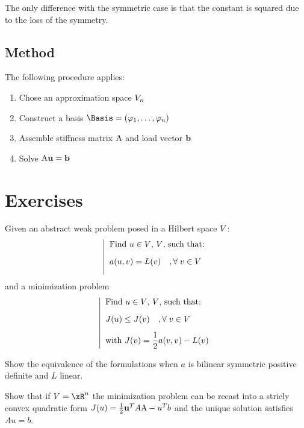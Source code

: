 The only difference with the symmetric case is that the constant is squared due to the loss of the symmetry.

\subsection{Method}

\begin{lgrthm}\label{alg:galerkin} The following procedure applies:
\begin{enumerate}
\item Chose an approximation space ${V}_n$
\item Construct a basis $\Basis= (\varphi_1,\dots,\varphi_n)$
\item Assemble stiffness matrix ${\mathrm A}$ and load vector $\mathbf b$
\item Solve ${\mathrm A} \mathbf u = \mathbf b$
\end{enumerate}
\end{lgrthm}



\newpage

\section{Exercises}

\begin{xrcs}
Given an abstract weak problem posed in a Hilbert space ${V}$:
\begin{equation*}
\left\lvert
\begin{array}{ll}
\mbox{Find $u \in {V}$, ${V}$, such that:}\\[2ex]
a( u, v ) = L(v)\quad,{\forall\;}  v \in {V}\\[2ex]
\end{array}
\right .
\end{equation*}
and a minimization problem
\begin{equation*}
\left\lvert
\begin{array}{ll}
\mbox{Find $u \in {V}$, ${V}$, such that:}\\[2ex]
J(u) \leq J(v)\quad,{\forall\;}  v \in {V}\\[2ex]
\mbox{with $J(v) = \displaystyle\frac{1}{2} a(v,v) - L(v)$}
\end{array}
\right .
\end{equation*}
\begin{tmatsks}
\item Show the equivalence of the formulations when $a$ is bilinear symmetric positive definite and $L$ linear.
\item Show that if $\xV = \xR^n$ the minimization problem can be recast into a stricly convex quadratic form $J(u) = \frac{1}{2} \mathbf u^T A {\mathrm A} - u^T b$ and the unique solution satisfies $A u = b$.
\end{tmatsks}
\end{xrcs}

